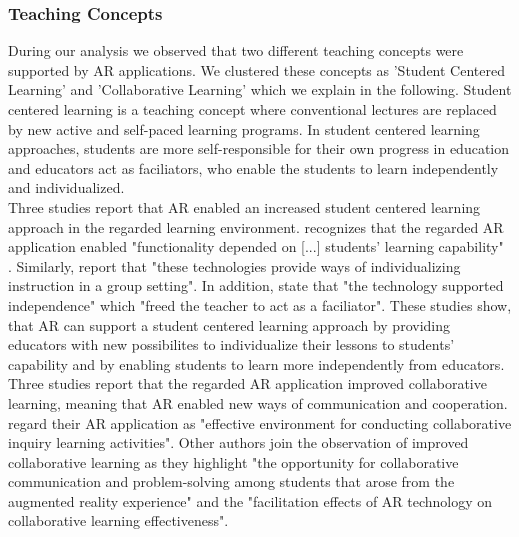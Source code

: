 \subsubsection{Teaching Concepts}
During our analysis we observed that two different teaching concepts were supported by AR applications. We clustered these concepts as 'Student Centered Learning' and 'Collaborative Learning' which we explain in the following.
Student centered learning is a teaching concept where conventional lectures are replaced by new active and self-paced learning programs. In student centered learning approaches, students are more self-responsible for their own progress in education and educators act as faciliators, who enable the students to learn independently and individualized.\\
Three studies report that AR enabled an increased student centered learning approach in the regarded learning environment. \cite{VateULan.2012} recognizes that the regarded AR application enabled "functionality depended on [...] students’ learning capability" \autocite [894]{VateULan.2012}. Similarly, \cite{Kamarainen.2013} report that "these technologies provide ways of individualizing instruction in a group setting".\autocite[554]{Kamarainen.2013} In addition, \cite{Kamarainen.2013} state that "the technology supported independence" which "freed the teacher to act as a faciliator".\autocite[554]{Kamarainen.2013} These studies show, that AR can support a student centered learning approach by providing educators with new possibilites to individualize their lessons to students' capability and by enabling students to learn more independently from educators.
Three studies report that the regarded AR application improved collaborative learning, meaning that AR enabled new ways of communication and cooperation. \cite{Wang.2012} regard their AR application as "effective environment for conducting collaborative inquiry learning activities". \autocite[57]{Wang.2012} Other authors join the observation of improved collaborative learning as they highlight "the opportunity for collaborative communication and problem-solving among students that arose from the augmented reality experience" \autocite[552]{Kamarainen.2013} and the "facilitation effects of AR technology on collaborative learning effectiveness".\autocite[322]{Li.2011}
% 

